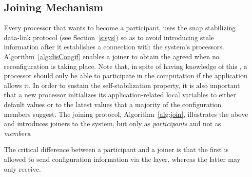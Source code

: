 \documentclass[11pt]{article}
\begin{document}
\subsection{Joining Mechanism}
\label{sec:join}
Every processor that wants to become a participant, uses the snap stabilizing data-link protocol (see Section~\ref{s:sys}) so as to avoid introducing stale information after it establishes a connection with the system's processors. 
Algorithm~\ref{alg:disCongif} enables a joiner to obtain the agreed  when no reconfiguration is taking place.
Note that, in spite of having knowledge of this , a processor should only be able to participate in the computation if the application allows it.
In order to sustain the self-stabilization property, it is also important that a new processor initializes its application-related local variables to either default values or to the latest values that a majority of the configuration members suggest.
The joining protocol, Algorithm~\ref{alg:join}, illustrates the above and introduces joiners to the system, but only as \emph{participants} and not as  \emph{members}.

The critical difference between a participant and a joiner is that the first is allowed to send configuration information via the  layer, whereas the latter may only receive.
\end{document}
